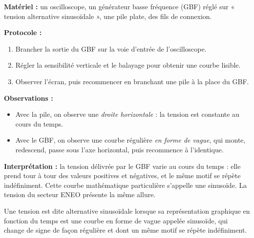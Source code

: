 \documentclass[11pt]{article}
\newcommand{\cle}[1]{{\popxbold\color{popdark}#1}}
\begin{document}
\begin{experience}
\textbf{Matériel :} un oscilloscope, un générateur basse fréquence (GBF) réglé sur « tension alternative sinusoïdale », une pile plate, des fils de connexion.

\textbf{Protocole :}
\begin{enumerate}
\item Brancher la sortie du GBF sur la voie d'entrée de l'oscilloscope.
\item Régler la sensibilité verticale et le balayage pour obtenir une courbe lisible.
\item Observer l'écran, puis recommencer en branchant une pile à la place du GBF.
\end{enumerate}

\textbf{Observations :}
\begin{itemize}
\item Avec la pile, on observe une \emph{droite horizontale} : la tension est constante au cours du temps.
\item Avec le GBF, on observe une courbe régulière \emph{en forme de vague}, qui monte, redescend, passe sous l'axe horizontal, puis recommence à l'identique.
\end{itemize}

\textbf{Interprétation :} la tension délivrée par le GBF varie au cours du temps : elle prend tour à tour des valeurs positives et négatives, et le même motif se répète indéfiniment. Cette courbe mathématique particulière s'appelle une \cle{sinusoïde}. La tension du secteur ENEO présente la même allure.
\end{experience}

\begin{definition}
Une tension est dite \cle{alternative sinusoïdale} lorsque sa représentation graphique en fonction du temps est une courbe en forme de vague appelée \cle{sinusoïde}, qui change de signe de façon régulière et dont un même motif se répète indéfiniment.
\end{definition}
\end{document}
